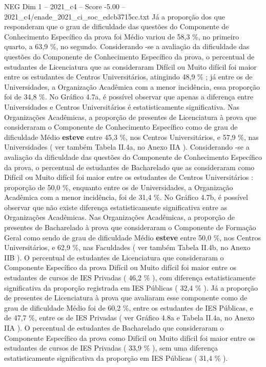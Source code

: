 \begin{textsample}{NEG Dim 1 – 2021\_c4 – Score -5.00 – 2021\_c4/enade\_2021\_ci\_soc\_edcb3715cc.txt}
Já a proporção dos que responderam que o grau de dificuldade das questões do Componente de Conhecimento Específico da prova foi Médio variou de 58,3 \%, no primeiro quarto, a 63,9 \%, no segundo.
Considerando -se a avaliação da dificuldade das questões do Componente de Conhecimento Específico da prova, o percentual de estudantes de Licenciatura que as consideraram Difícil ou Muito difícil foi maior entre os estudantes de Centros Universitários, atingindo 48,9 \% ; já entre os de Universidades, a Organização Acadêmica com a menor incidência, essa proporção foi de 34,8 \%.
No Gráfico 4.7a, é possível observar que apenas a diferença entre Universidades e Centros Universitários é estatisticamente significativa.
Nas Organizações Acadêmicas, a proporção de presentes de Licenciatura à prova que consideraram o Componente de Conhecimento Específico como de grau de dificuldade Médio \textbf{esteve} entre 45,3 \%, nos Centros Universitários, e 57,9 \%, nas Universidades ( ver também Tabela II.4a, no Anexo IIA ).
Considerando -se a avaliação da dificuldade das questões do Componente de Conhecimento Específico da prova, o percentual de estudantes de Bacharelado que as consideraram como Difícil ou Muito difícil foi maior entre os estudantes de Centros Universitários : proporção de 50,0 \%, enquanto entre os de Universidades, a Organização Acadêmica com a menor incidência, foi de 31,4 \%.
No Gráfico 4.7b, é possível observar que não existe diferença estatisticamente significativa entre as Organizações Acadêmicas.
Nas Organizações Acadêmicas, a proporção de presentes de Bacharelado à prova que consideraram o Componente de Formação Geral como sendo de grau de dificuldade Médio \textbf{esteve} entre 50,0 \%, nos Centros Universitários, e 62,9 \%, nas Faculdades ( ver também Tabela II.4b, no Anexo IIB ).
O percentual de estudantes de Licenciatura que consideraram o Componente Específico da prova Difícil ou Muito difícil foi maior entre os estudantes de cursos de IES Privadas ( 46,2 \% ), com diferença estatisticamente significativa da proporção registrada em IES Públicas ( 32,4 \% ).
Já a proporção de presentes de Licenciatura à prova que avaliaram esse componente como de grau de dificuldade Médio foi de 60,2 \%, entre os estudantes de IES Públicas, e de 47,7 \%, entre os de IES Privadas ( ver Gráfico 4.8a e Tabela II.4a, no Anexo IIA ).
O percentual de estudantes de Bacharelado que consideraram o Componente Específico da prova como Difícil ou Muito difícil foi maior entre os estudantes de cursos de IES Privadas ( 33,9 \% ), sem uma diferença estatisticamente significativa da proporção em IES Públicas ( 31,4 \% ).

\end{textsample}
